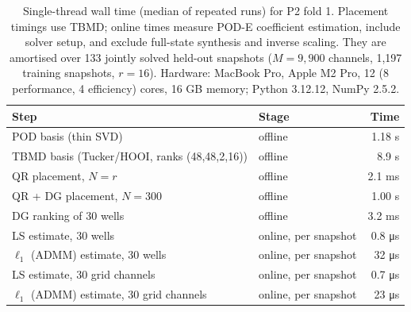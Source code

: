 \begin{table}[tbp]
\centering
\small
\caption{Single-thread wall time (median of repeated runs) for P2 fold 1. Placement timings use TBMD; online times measure POD-E coefficient estimation, include solver setup, and exclude full-state synthesis and inverse scaling. They are amortised over 133 jointly solved held-out snapshots ($M=9{,}900$ channels, 1{,}197 training snapshots, $r=16$). Hardware: MacBook Pro, Apple M2 Pro, 12 (8 performance, 4 efficiency) cores, 16 GB memory; Python 3.12.12, NumPy 2.5.2.}
\label{tab:cost}
\begin{tabular}{@{}llr@{}}
\toprule
Step & Stage & Time \\
\midrule
POD basis (thin SVD) & offline & 1.18 s \\
TBMD basis (Tucker/HOOI, ranks (48,48,2,16)) & offline & 8.9 s \\
QR placement, $N=r$ & offline & 2.1 ms \\
QR + DG placement, $N=300$ & offline & 1.00 s \\
DG ranking of 30 wells & offline & 3.2 ms \\
LS estimate, 30 wells & online, per snapshot & 0.8 \si{\micro\second} \\
$\ell_1$ (ADMM) estimate, 30 wells & online, per snapshot & 32 \si{\micro\second} \\
LS estimate, 30 grid channels & online, per snapshot & 0.7 \si{\micro\second} \\
$\ell_1$ (ADMM) estimate, 30 grid channels & online, per snapshot & 23 \si{\micro\second} \\
\bottomrule
\end{tabular}
\end{table}

